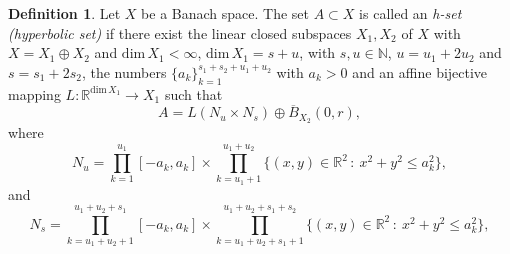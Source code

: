\documentclass[11pt, leqno]{amsart}
\theoremstyle{definition}
\newtheorem{df}[thm]{Definition}
\def\R{\mathbb{R}}
\begin{document}
\begin{df}\label{h-set}
	Let $X$ be a Banach space.
	The set $A \subset X$ is called an \textit{h-set (hyperbolic set)}  if there exist the linear closed subspaces $X_1, X_2$ of $X$ with $X = X_1 \oplus X_2$ and $\textrm{dim}\, X_1  < \infty$, $\textrm{dim}\, X_1 = s + u$, with $s, u \in \mathbb{N}$, $u=u_1+2u_2$ and $s=s_1+2s_2$, the numbers $\{a_k\}_{k=1}^{s_1+s_2+u_1+u_2}$ with $a_k>0$ and an affine bijective mapping $L:\R^{\textrm{dim}\, X_1}\to X_1$ such that
	$$
	A = L \left( N_u \times N_s\right) \oplus \overline{B}_{X_2}(0,r),
	$$
	where
	$$
	N_u = \prod_{k=1}^{u_1}[-a_k, a_k] \times \prod_{k=u_1+1}^{u_1+u_2}\{(x,y)\in \mathbb{R}^2\, :\ x^2+y^2\leq a_k^2\},
	$$
	and
	$$
	N_s = \prod_{k=u_1+u_2+1}^{u_1+u_2+s_1}[-a_k, a_k] \times \prod_{k=u_1+u_2+s_1+1}^{u_1+u_2+s_1+s_2}\{(x,y)\in \mathbb{R}^2\, :\ x^2+y^2\leq a_k^2\},
	$$
\end{df}

\medskip
\end{document}
